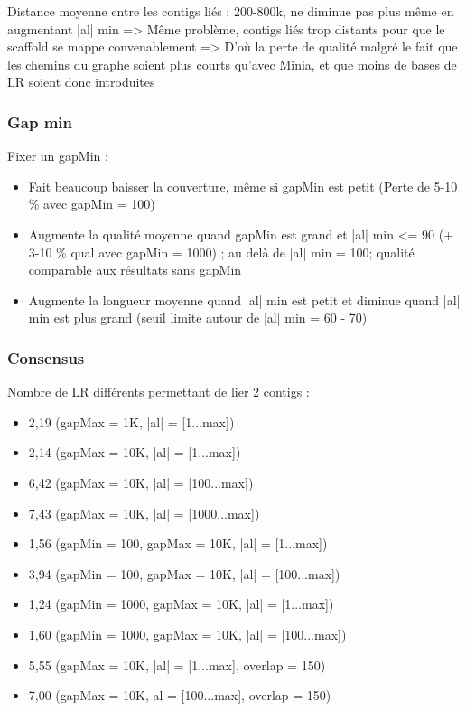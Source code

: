 \documentclass[12pt]{article}
\begin{document}
Distance moyenne entre les contigs liés : 200-800k, ne diminue pas plus même en augmentant |al| min => Même problème, contigs liés trop distants pour que le scaffold se mappe convenablement  => D'où la perte de qualité malgré le fait que les chemins du graphe soient plus courts qu'avec Minia, et que moins de bases de LR soient donc introduites

\subsubsection{Gap min}

Fixer un gapMin : 

\begin{itemize}
	\item Fait beaucoup baisser la couverture, même si gapMin est petit (Perte de 5-10 \% avec gapMin = 100)
	
	\item Augmente la qualité moyenne quand gapMin est grand et |al| min <= 90 (+ 3-10 \% qual avec gapMin = 1000) ;
	au delà de |al| min = 100; qualité comparable aux résultats sans gapMin
	
	\item Augmente la longueur moyenne quand |al| min est petit et diminue quand |al| min est plus grand (seuil limite autour de |al| min = 60 - 70)
\end{itemize}

\subsubsection{Consensus}

Nombre de LR différents permettant de lier 2 contigs :

\begin{itemize}
	\item 2,19 (gapMax = 1K, |al| = [1...max])
	
	\item 2,14 (gapMax = 10K, |al| = [1...max])
	
	\item 6,42 (gapMax = 10K, |al| = [100...max])
	
	\item 7,43 (gapMax = 10K, |al| = [1000...max])
	
	\item 1,56 (gapMin = 100, gapMax = 10K, |al| = [1...max])
	
	\item 3,94 (gapMin = 100, gapMax = 10K, |al| = [100...max])
	
	\item 1,24 (gapMin = 1000, gapMax = 10K, |al| = [1...max])
	
	\item 1,60 (gapMin = 1000, gapMax = 10K, |al| = [100...max])
	
	\item 5,55 (gapMax = 10K, |al| = [1...max], overlap = 150)
	
	\item 7,00 (gapMax = 10K, al = [100...max], overlap = 150)
\end{itemize}
\end{document}
